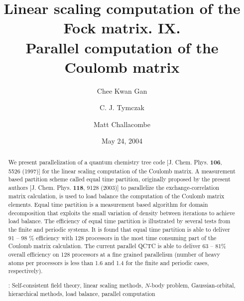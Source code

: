 \commentoutA{\documentclass[prl,aps,twocolumn,twocolumngrid,superbib]{revtex4}}
\begin{document}
\title[Short Title]{
Linear scaling computation of the Fock matrix. IX. \\
Parallel computation of the Coulomb matrix}

\author{Chee Kwan Gan\footnotemark[1]}
\author{C. J. Tymczak\footnotemark[2]}
\author{Matt Challacombe\footnotemark[3]}


\date{May 24, 2004}

\begin{abstract}
We present parallelization of a quantum chemistry tree code
[J. Chem. Phys. {\bf 106}, 5526 (1997)] for the linear scaling
computation of the Coulomb matrix. A measurement based partition
scheme called equal time partition, originally proposed by the present
authors [J. Chem. Phys. {\bf 118}, 9128 (2003)] to parallelize the
exchange-correlation matrix calculation, is used to load balance the
computation of the Coulomb matrix elements.  Equal time partition is a
measurement based algorithm for domain decomposition that exploits the
small variation of density between iterations to achieve load
balance. The efficiency of equal time partition is illustrated by
several tests from the finite and periodic systems.  It is found that
equal time partition is able to deliver 91 -- 98 \% efficiency with
128 processors in the most time consuming part of the
Coulomb matrix calculation.
The current parallel QCTC is able to deliver 63 -- 81\% overall
efficiency on 128 processors at a fine grained parallelism (number of
heavy atoms per processors is less than 1.6 and 1.4 for the finite and
periodic cases, respectively).


\smallskip
{}:
Self-consistent field theory, linear scaling methods, $N$-body problem,
Gaussian-orbital, hierarchical methods,
load balance, parallel computation
\end{abstract}
\maketitle
\end{document}
